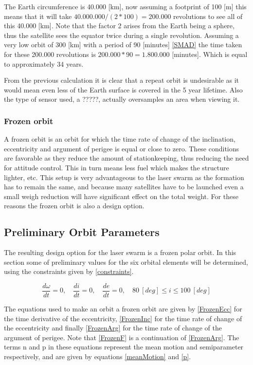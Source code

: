The Earth circumference is 40.000 [km], now assuming a footprint of 100 [m] this means that it will take $40.000.000/(2*100)=200.000$ revolutions to see all of this 40.000 [km]. Note that the factor 2 arises from the Earth being a sphere, thus the satellite sees the equator twice during a single revolution. Assuming a very low orbit of 300 [km] with a period of 90 [minutes] \ref{SMAD} the time taken for these 200.000 revolutions is $200.000*90=1.800.000$ [minutes]. Which is equal to approximately 34 years.

From the previous calculation it is clear that a repeat orbit is undesirable as it would mean even less of the Earth surface is covered in the 5 year lifetime. Also the type of sensor used, a ?????, actually oversamples an area when viewing it.

\subsubsection{Frozen orbit}
A frozen orbit is an orbit for which the time rate of change of the inclination, eccentricity and argument of perigee is equal or close to zero. These conditions are favorable as they reduce the amount of stationkeeping, thus reducing the need for attitude control. This in turn means less fuel which makes the structure lighter, etc.
This setup is very advantageous to the laser swarm as the formation has to remain the same, and because many satellites have to be launched even a small weigh reduction will have significant effect on the total weight. For these reasons the frozen orbit is also a design option.

\subsection{Preliminary Orbit Parameters}
The resulting design option for the laser swarm is a frozen polar orbit. In this section some of preliminary values for the six orbital elements will be determined, using the constraints given by \ref{constraints}.

\begin{equation}
\frac{{d\omega }}{{dt}} = 0,\quad \frac{{di }}{{dt}} = 0,\quad \frac{{de }}{{dt}} = 0,\quad 80\ [deg] \leq i \leq 100\ [deg]
\label{constraints}
\end{equation}

The equations used to make an orbit a frozen orbit are given by \ref{FrozenEcc} for the time derivative of the eccentricity, \ref{FrozenInc} for the time rate of change of the eccentricity and finally \ref{FrozenArg} for the time rate of change of the argument of perigee. Note that \ref{FrozenF} is a continuation of \ref{FrozenArg}. The terms n and p in these equations represent the mean motion and semiparameter respectively, and are given by equations \ref{meanMotion} and \ref{p}.

